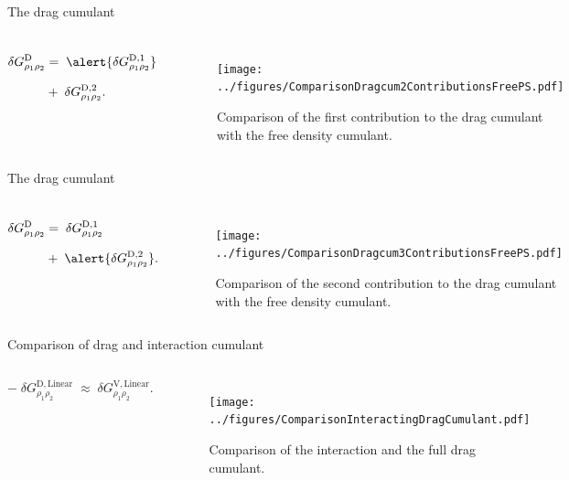 \documentclass[10pt]{beamer}
\begin{document}
  \begin{frame}[fragile]{The drag cumulant}

  		\begin{columns}
	\begin{align*}
\delta G^{ \mathrm{D}}_{\rho_1 \rho_2}&=\; \alert{\delta G^{ \mathrm{D},1}_{\rho_1 \rho_2}} \; \\[7pt]
&+\; \delta G^{ \mathrm{D},2}_{\rho_1 \rho_2}.
	\end{align*}
	\begin{figure}
	\texttt{[image: ../figures/ComparisonDragcum2ContributionsFreePS.pdf]}
\caption{Comparison of the first contribution to the drag cumulant with the free density cumulant.}
		
	\end{figure}
	
\end{columns}

\end{frame}
  \begin{frame}[fragile]{The drag cumulant}

\begin{columns}
	\begin{align*}
	\delta G^{ \mathrm{D}}_{\rho_1 \rho_2}&=\; \delta G^{ \mathrm{D},1}_{\rho_1 \rho_2}\; \\[7pt]
	&+\; \alert{\delta G^{ \mathrm{D},2}_{\rho_1 \rho_2}}.
	\end{align*}
	\begin{figure}
		\texttt{[image: ../figures/ComparisonDragcum3ContributionsFreePS.pdf]}
		\caption{Comparison of the second contribution to the drag cumulant with the free density cumulant.}
		
	\end{figure}
	
\end{columns}

\end{frame}

\begin{frame}[fragile]{Comparison of drag and interaction cumulant}
\begin{columns}
	\begin{equation*}
	- \;\delta G^{ \mathrm{D},\mathrm{Linear}}_{\rho_1 \rho_2} \;\approx \;\delta G^{ \mathrm{V}, \mathrm{Linear}}_{\rho_1 \rho_2}.
	\end{equation*}
	\begin{figure}
		\texttt{[image: ../figures/ComparisonInteractingDragCumulant.pdf]}
		\caption{Comparison of the interaction and the full drag cumulant.}
		
	\end{figure}
	
\end{columns}

\end{frame}
\end{document}
